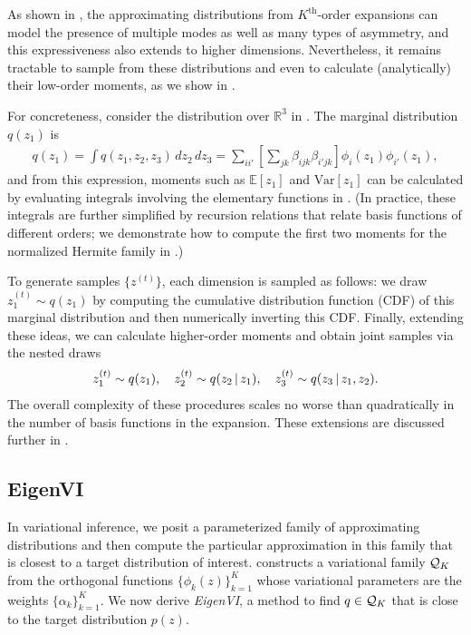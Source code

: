 As shown in , the approximating distributions
from $K^\text{th}$-order expansions can model the presence of multiple
modes as well as many types of asymmetry, and this expressiveness also
extends to higher dimensions. Nevertheless, it remains tractable to
sample from these distributions and even to calculate (analytically)
their low-order moments, as we show in .

For concreteness, consider the distribution over $\mathbb{R}^3$ in
. The marginal distribution $q(z_1)$ is
\begin{align}
q(z_1) = \int\! q(z_1,z_2,z_3)\,dz_2\, dz_3 = \sum_{ii'} \left[\sum_{jk} \beta_{ijk}\beta_{i'jk}\right] \phi_i(z_1)\phi_{i'}(z_1),
\label{eq:marginal}
\end{align}
and from this expression, moments such as $\mathbb{E}[z_1]$
and
$\text{Var}[z_1]$
can be calculated by evaluating integrals involving
the elementary functions in .
(In practice,
these integrals are further simplified by recursion relations that
relate basis functions of different orders;
we demonstrate how to compute the first two moments for
the normalized Hermite family in
.)

To generate samples $\{z^{(t)}\}$, each dimension is sampled as follows:
we draw
$z_1^{(t)} \sim q(z_1)$ by computing the cumulative distribution function (CDF)
of this marginal distribution and then numerically inverting this CDF.
Finally, extending these ideas, we can calculate higher-order moments
and obtain joint samples via the nested draws
\begin{align}
\label{eq:sample}
    z_1^{(t)} \sim q(z_1),\quad z_2^{(t)} \sim q(z_2 \,|\, z_1),\quad
    z_3^{(t)} \sim q(z_3  \,|\, z_1,z_2).
\end{align}
The overall complexity of these procedures scales no worse than
quadratically in the number of basis functions in the expansion. These
extensions are discussed further in .


\subsection{EigenVI}
\label{sec:eigenVI}

In variational inference, we posit a parameterized family of
approximating distributions and then compute the particular approximation
in this family that is closest to a target distribution of interest.
constructs a variational family $\mathcal{Q}_K$ from the orthogonal functions $\{\phi_k(z)\}_{k=1}^K$ whose variational parameters are the weights
$\{\alpha_k\}_{k=1}^{K}$. We now derive \textit{EigenVI}, a method to find
$q \in \mathcal{Q}_K$ that is close to the target distribution $p(z)$.

